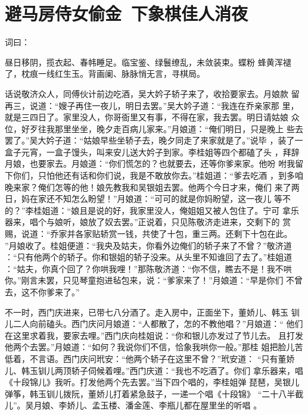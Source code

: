 \chapter{避马房侍女偷金~下象棋佳人消夜}

词曰：

昼日移阴，揽衣起、春帏睡足。临宝鉴、绿鬟缭乱，未敛装束。蝶粉
蜂黄浑褪了，枕痕一线红生玉。背画阑、脉脉悄无言，寻棋局。

话说敬济众人，同傅伙计前边吃酒，吴大妗子轿子来了，收拾要家去。月娘款
留再三，说道：“嫂子再住一夜儿，明日去罢。”吴大妗子道：“我连在乔亲家那
里，就是三四日了。家里没人，你哥衙里又有事，不得在家，我去罢。明日请姑娘
众位，好歹往我那里坐坐，晚夕走百病儿家来。”月娘道：“俺们明日，只是晚上
些去罢了。”吴大妗子道：“姑娘早些坐轿子去，晚夕同走了来家就是了。”说毕
，装了一盒子元宵，一盒子馒头，叫来安儿送大妗子到家。李桂姐等四个都磕了头
，拜辞月娘，也要家去。月娘道：“你们慌怎的？也就要去，还等你爹来家。他吩
咐我留下你们，只怕他还有话和你们说，我是不敢放你去。”桂姐道：“爹去吃酒
，到多咱晚来家？俺们怎等的他！娘先教我和吴银姐去罢。他两个今日才来，俺们
来了两日，妈在家还不知怎么盼望！”月娘道：“可可的就是你妈盼望，这一夜儿
等不的？”李桂姐道：“娘且是说的好，我家里没人，俺姐姐又被人包住了。宁可
拿乐器来，唱个与娘听，娘放了奴去罢。”正说着，只见陈敬济走进来，交剩下的
赏赐，说道：“乔家并各家贴轿赏一钱，共使了十包，重三两。还剩下十包在此。
”月娘收了。桂姐便道：“我央及姑夫，你看外边俺们的轿子来了不曾？”敬济道
：“只有他两个的轿子。你和银姐的轿子没来。从头里不知谁回了去了。”桂姐道
：“姑夫，你真个回了？你哄我哩！”那陈敬济道：“你不信，瞧去不是！我不哄
你。”刚言未罢，只见琴童抱进毡包来，说：“爹家来了！”月娘道：“早是你们
不曾去，这不你爹来了。”

不一时，西门庆进来，已带七八分酒了。走入房中，正面坐下，董娇儿、韩玉
钏儿二人向前磕头。西门庆问月娘道：“人都散了，怎的不教他唱？”月娘道：“
他们在这里求着我，要家去哩。”西门庆向桂姐说：“你和银儿亦发过了节儿去。
且打发他两个去罢。”月娘道：“如何？我说你们不信，恰象我哄你一般。”那桂
姐把脸儿苦低着，不言语。西门庆问玳安：“他两个轿子在这里不曾？”玳安道：
“只有董娇儿、韩玉钏儿两顶轿子伺候着哩。”西门庆道：“我也不吃酒了。你们
拿乐器来，唱《十段锦儿》我听。打发他两个先去罢。”当下四个唱的，李桂姐弹
琵琶，吴银儿弹筝，韩玉钏儿拨阮，董娇儿打着紧急鼓子，一递一个唱《十段锦》
“二十八半截儿”。吴月娘、李娇儿、孟玉楼、潘金莲、李瓶儿都在屋里坐的听唱
。

